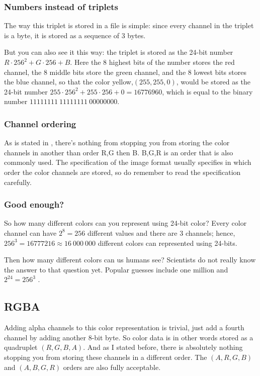 \subsubsection{Numbers instead of triplets}

The way this triplet is stored in a file is simple: since every
channel in the triplet is a byte, it is stored as a sequence of 3
bytes.

But you can also see it this way: the triplet is stored as the 24-bit
number $R \cdot 256^2 + G \cdot 256 + B$. Here the 8 highest bits of
the number stores the red channel, the 8 middle bits store the green
channel, and the 8 lowest bits stores the blue channel, so that the
color yellow,$(255,255,0)$, would be stored as the 24-bit number $255
\cdot 256^2 + 255 \cdot 256 + 0 = 16776960$, which is equal to the
binary number $11111111\ 11111111\ 00000000$.

\subsubsection{Channel ordering}

As is stated in \cite{murray1996encyclopedia}, there's nothing from
stopping you from storing the color channels in another than order R,G
then B. B,G,R is an order that is also commonly used. The
specification of the image format usually specifies in which order the
color channels are stored, so do remember to read the specification
carefully.

\subsubsection{Good enough?}

So how many different colors can you represent using 24-bit color?
Every color channel can have $2^8 = 256$ different values and there
are $3$ channels; hence, $256^3 = 16777216 \approx 16\ 000\ 000$ different colors
can represented using 24-bits.

Then how many different colors can us humans see? Scientists do not
really know the answer to that question yet. Popular guesses include
one million \cite{roth:_tetrachromat} and $2^{24} = 256^3$
\cite{murray1996encyclopedia}.

\subsection{RGBA}

Adding alpha channels to this color representation is trivial, just
add a fourth channel by adding another 8-bit byte. So \rgba color data
is in other words stored as a quadruplet $(R,G,B,A)$. And as I stated
before, there is absolutely nothing stopping you from storing these
channels in a different order. The $(A,R,G,B)$ and $(A,B,G,R)$ orders
are also fully acceptable.

